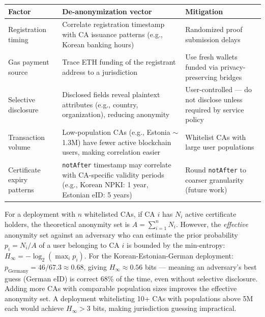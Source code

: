 \documentclass[11pt, a4paper]{article}
\begin{document}
\begin{longtable}[]{@{}
  >{\raggedright\arraybackslash}p{}
  >{\raggedright\arraybackslash}p{}
  >{\raggedright\arraybackslash}p{}@{}}
\toprule\noalign{}
\begin{minipage}[b]{\linewidth}\raggedright
Factor
\end{minipage} & \begin{minipage}[b]{\linewidth}\raggedright
De-anonymization vector
\end{minipage} & \begin{minipage}[b]{\linewidth}\raggedright
Mitigation
\end{minipage} \\
\midrule\noalign{}
\endhead
\bottomrule\noalign{}
\endlastfoot
Registration timing & Correlate registration timestamp with CA issuance
patterns (e.g., Korean banking hours) & Randomized proof submission
delays \\
Gas payment source & Trace ETH funding of the registrant address to a
jurisdiction & Use fresh wallets funded via privacy-preserving
bridges \\
Selective disclosure & Disclosed fields reveal plaintext attributes
(e.g., country, organization), reducing anonymity &
User-controlled --- do not disclose unless required by service policy \\
Transaction volume & Low-population CAs (e.g., Estonia
$\sim$1.3M) have fewer active blockchain users, making
correlation easier & Whitelist CAs with large user populations \\
Certificate expiry patterns & \texttt{notAfter} timestamp may correlate
with CA-specific validity periods (e.g., Korean NPKI: 1 year, Estonian
eID: 5 years) & Round \texttt{notAfter} to coarser granularity (future
work) \\
\end{longtable}

For a deployment with \(n\) whitelisted CAs, if CA \(i\) has \(N_i\)
active certificate holders, the theoretical anonymity set is
\(A = \sum_{i=1}^{n} N_i\). However, the \emph{effective} anonymity set
against an adversary who can estimate the prior probability
\(p_i = N_i / A\) of a user belonging to CA \(i\) is bounded by the
min-entropy: \(H_\infty = -\log_2(\max_i p_i)\). For the
Korean-Estonian-German deployment:
\(p_{\text{Germany}} = 46/67.3 \approx 0.68\), giving
\(H_\infty \approx 0.56\) bits --- meaning an adversary's best guess
(German eID) is correct 68\% of the time, even without selective
disclosure. Adding more CAs with comparable population sizes improves
the effective anonymity set. A deployment whitelisting 10+ CAs with
populations above 5M each would achieve \(H_\infty > 3\) bits, making
jurisdiction guessing impractical.
\end{document}
